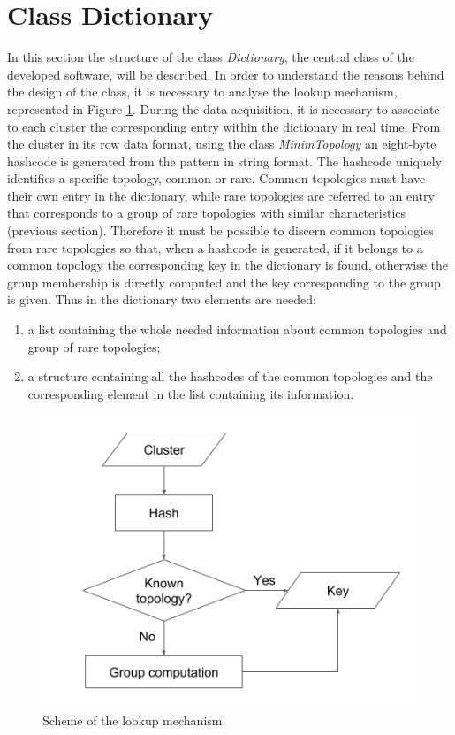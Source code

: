 \section{Class Dictionary}
\label{sec:dic}
In this section the structure of the class \textit{Dictionary}, the central class of the developed software, will be described. In order to understand the reasons behind the design of the class, it is necessary to analyse the lookup mechanism, represented in Figure \ref{fig:lucap}. During the data acquisition, it is necessary to associate to each cluster the corresponding entry within the dictionary in real time. From the cluster in its row data format, using the class \textit{MinimTopology} an eight-byte hashcode is generated from the pattern in string format. The hashcode uniquely identifies a specific topology, common or rare.
Common topologies must have their own entry in the dictionary, while rare topologies are referred to an entry that corresponds to a group of rare topologies with similar characteristics (previous section).
Therefore it must be possible to discern common topologies from rare topologies so that, when a hashcode is generated, if it belongs to a common topology the corresponding key in the dictionary is found, otherwise the group membership is directly computed and the key corresponding to the group is given. Thus in the dictionary two elements are needed:
\begin{enumerate}
 \item a list containing the whole needed information about common topologies and group of rare topologies;
 \item a structure containing all the hashcodes of the common topologies and the corresponding element in the list containing its information.
\end{enumerate}
%
\begin{figure}
  \centering
  \includegraphics[scale=0.6]{figures/lucap.png}
  \caption{Scheme of the lookup mechanism.}
  \label{fig:lucap}
\end{figure}
%

